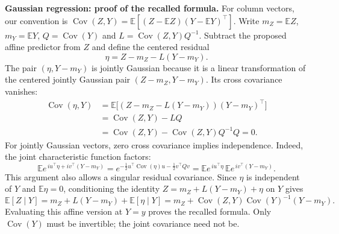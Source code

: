 \documentclass[11pt,a4paper]{article}
\theoremstyle{exostyle}
\newcommand{\EE}{\mathbb{E}}
\newcommand{\Cov}{\operatorname{Cov}}
\begin{document}
\begin{solution}
\textbf{Gaussian regression: proof of the recalled formula.}
For column vectors, our convention is
$\Cov(Z,Y)=\EE[(Z-\EE Z)(Y-\EE Y)^\top]$.
Write $m_Z=\EE Z$, $m_Y=\EE Y$, $Q=\Cov(Y)$ and
$L=\Cov(Z,Y)Q^{-1}$. Subtract the proposed affine predictor from $Z$
and define the centered residual
\[
  \eta=Z-m_Z-L(Y-m_Y).
\]
The pair $(\eta,Y-m_Y)$ is jointly Gaussian because it is a linear
transformation of the centered jointly Gaussian pair $(Z-m_Z,Y-m_Y)$.
Its cross covariance vanishes:
\begin{align*}
  \Cov(\eta,Y)
    &=\EE\bigl[(Z-m_Z-L(Y-m_Y))(Y-m_Y)^\top\bigr]\\
    &=\Cov(Z,Y)-LQ\\
    &=\Cov(Z,Y)-\Cov(Z,Y)Q^{-1}Q=0.
\end{align*}
For jointly Gaussian vectors, zero cross covariance implies
independence. Indeed, the joint characteristic function factors:
\[
  \EE e^{\,i u^\top\eta+i v^\top(Y-m_Y)}
   =e^{-\frac12u^\top\Cov(\eta)u-\frac12v^\top Qv}
   =\EE e^{\,i u^\top\eta}\,\EE e^{\,i v^\top(Y-m_Y)}.
\]
This argument also allows a singular residual covariance.
Since $\eta$ is independent of $Y$ and $\EE\eta=0$, conditioning the
identity $Z=m_Z+L(Y-m_Y)+\eta$ on $Y$ gives
\[
  \EE[Z\mid Y]
     =m_Z+L(Y-m_Y)+\EE[\eta\mid Y]
     =m_Z+\Cov(Z,Y)\Cov(Y)^{-1}(Y-m_Y).
\]
Evaluating this affine version at $Y=y$ proves the recalled formula.
Only $\Cov(Y)$ must be invertible; the joint covariance need not be.


\end{solution}
\end{document}
